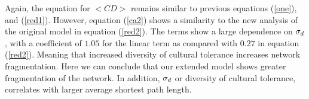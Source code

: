 Again, the equation for $<CD>$ remains similar to previous equations (\ref{one}),
and (\ref{red1}).
However, equation (\ref{ca2}) shows a similarity to the new analysis of the
original model in equation (\ref{red2}).
The terms show a large dependence on $\sigma_d$, with a coefficient of $1.05$ for the
linear term as compared with $0.27$ in equation (\ref{red2}).
Meaning that increased diversity of cultural tolerance increases network
fragmentation.
Here we can conclude that our extended model shows greater fragmentation
of the network.
In addition, $\sigma_d$ or diversity of cultural tolerance, correlates with larger
average shortest path length.

